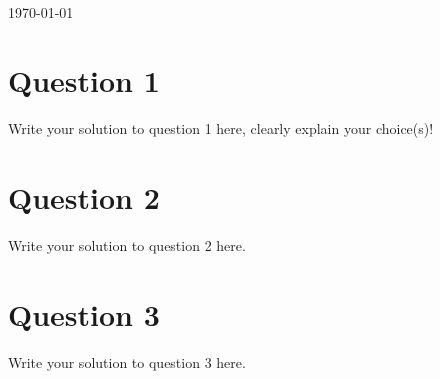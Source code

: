 \documentclass[12pt]{article}
\begin{document}
\begin{titlepage}
\begin{minipage}{0.4\textwidth}
\begin{flushright}
\end{flushright}
\end{minipage}\\[3cm]



{\large \today}\\[3cm] %


 

\vfill %

\end{titlepage}

\section*{Question 1}
Write your solution to question 1 here, clearly explain your choice(s)!

\section*{Question 2}
Write your solution to question 2 here.

\section*{Question 3}\label{results}
Write your solution to question 3 here.
\end{document}

